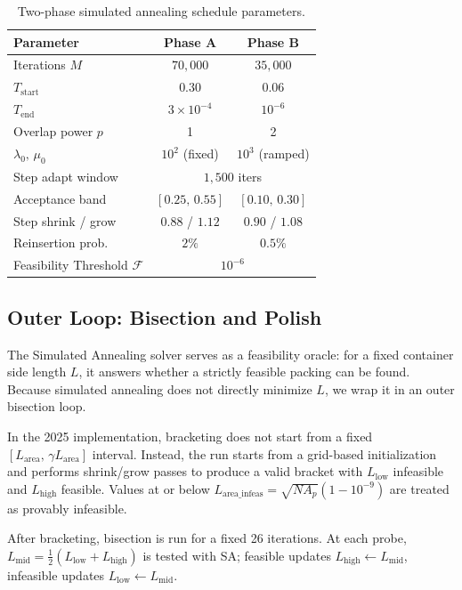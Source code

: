 \documentclass[10pt]{article}
\begin{document}
\begin{table}[t]
\centering\small
\setlength{\tabcolsep}{4.5pt}
\caption{Two-phase simulated annealing schedule parameters.}
\label{tab:sa}
\begin{tabular}{lcc}
\toprule
Parameter & Phase A & Phase B \\
\midrule
Iterations $M$                & $70{,}000$       & $35{,}000$ \\
$T_{\mathrm{start}}$          & $0.30$           & $0.06$ \\
$T_{\mathrm{end}}$            & $3\times10^{-4}$ & $10^{-6}$ \\
Overlap power $p$             & 1                & 2 \\
$\lambda_0,\,\mu_0$           & $10^2$ (fixed)   & $10^3$ (ramped) \\
Step adapt window             & \multicolumn{2}{c}{$1{,}500$ iters} \\
Acceptance band               & $[0.25,\,0.55]$  & $[0.10,\,0.30]$ \\
Step shrink / grow            & $0.88$ / $1.12$  & $0.90$ / $1.08$ \\
Reinsertion prob.             & $2\%$            & $0.5\%$ \\
Feasibility Threshold $\mathcal{F}$   & \multicolumn{2}{c}{$10^{-6}$} \\
\bottomrule
\end{tabular}
\end{table}
\subsection{Outer Loop: Bisection and Polish}

The Simulated Annealing solver serves as a feasibility oracle: for a fixed
container side length $L$, it answers whether a strictly feasible packing can be found.
Because simulated annealing does not directly minimize $L$, we wrap it in an outer bisection loop.

In the 2025 implementation, bracketing does not start from a fixed
$[L_{\mathrm{area}},\,\gamma L_{\mathrm{area}}]$ interval. Instead, the run starts from a
grid-based initialization and performs shrink/grow passes to produce a valid
bracket with $L_{\mathrm{low}}$ infeasible and $L_{\mathrm{high}}$ feasible. Values at or
below $L_{\mathrm{area\_infeas}} = \sqrt{N A_p}(1-10^{-9})$ are treated as provably infeasible.

After bracketing, bisection is run for a fixed 26 iterations. At each probe,
$L_{\mathrm{mid}} = \tfrac{1}{2}(L_{\mathrm{low}} + L_{\mathrm{high}})$ is tested with SA; feasible
updates $L_{\mathrm{high}} \leftarrow L_{\mathrm{mid}}$, infeasible updates
$L_{\mathrm{low}} \leftarrow L_{\mathrm{mid}}$.
\end{document}

